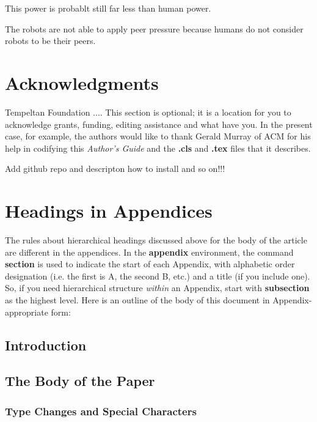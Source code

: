 \documentclass{acm_proc_article-sp}
\begin{document}
This power is probablt still far less than human power.

The robots are not able to apply peer pressure because humans do not consider robots to be their peers.




\section{Acknowledgments}
Tempeltan Foundation .... 
This section is optional; it is a location for you
to acknowledge grants, funding, editing assistance and
what have you.  In the present case, for example, the
authors would like to thank Gerald Murray of ACM for
his help in codifying this \textit{Author's Guide}
and the \textbf{.cls} and \textbf{.tex} files that it describes.

%

%
%
\appendix
Add github repo and descripton how to install and so on!!!
\section{Headings in Appendices}
The rules about hierarchical headings discussed above for
the body of the article are different in the appendices.
In the \textbf{appendix} environment, the command
\textbf{section} is used to
indicate the start of each Appendix, with alphabetic order
designation (i.e. the first is A, the second B, etc.) and
a title (if you include one).  So, if you need
hierarchical structure
\textit{within} an Appendix, start with \textbf{subsection} as the
highest level. Here is an outline of the body of this
document in Appendix-appropriate form:
\subsection{Introduction}
\subsection{The Body of the Paper}
\subsubsection{Type Changes and  Special Characters}
\end{document}
